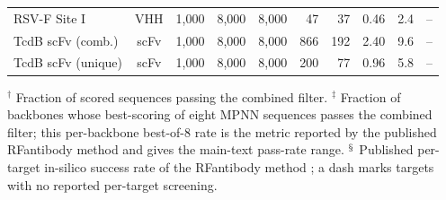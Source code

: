 \documentclass[11pt]{article}
\begin{document}
\begin{table}[!ht]
\begin{tabular}{@{}>{\raggedright\arraybackslash}p{32mm} c r r r r r r r r@{}}
RSV-F Site I & VHH & 1{,}000 & 8{,}000 & 8{,}000 & 47 & 37 & 0.46 & 2.4 & -- \\
\addlinespace
TcdB scFv (comb.) & scFv & 1{,}000 & 8{,}000 & 8{,}000 & 866 & 192 & 2.40 & 9.6 & -- \\
TcdB scFv (unique) & scFv & 1{,}000 & 8{,}000 & 8{,}000 & 200 & 77 & 0.96 & 5.8 & -- \\
\bottomrule
\end{tabular}
\par\medskip
\raggedright
$^{\dagger}$ Fraction of scored sequences passing the combined filter. $^{\ddagger}$
Fraction of backbones whose best-scoring of eight MPNN sequences passes the combined
filter; this per-backbone best-of-8 rate is the metric reported by the published
RFantibody method and gives the main-text pass-rate range.
$^{\mathsection}$ Published per-target in-silico success rate of the RFantibody method
\citep{bennett_atomically_2026}; a dash marks targets with no reported per-target
screening.
\end{table}

\clearpage


\end{document}
